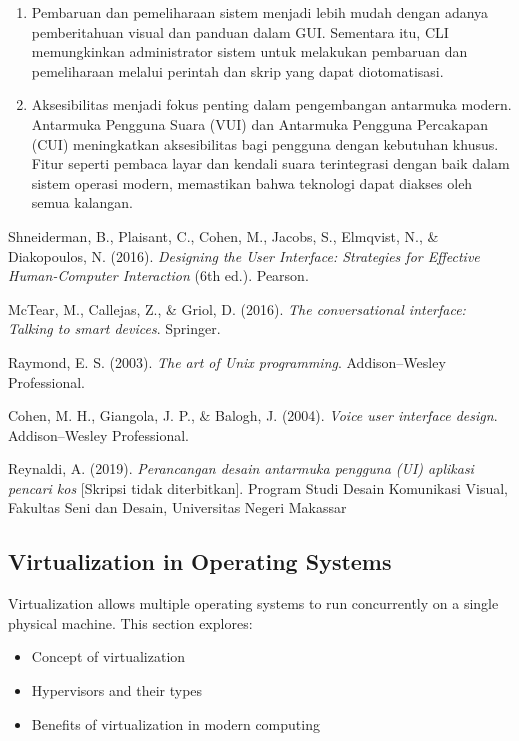 \documentclass[12pt]{article}
\begin{document}
\begin{enumerate}
\item {Pembaruan dan pemeliharaan sistem} menjadi lebih mudah dengan adanya pemberitahuan visual dan panduan dalam GUI. Sementara itu, CLI memungkinkan administrator sistem untuk melakukan pembaruan dan pemeliharaan melalui perintah dan skrip yang dapat diotomatisasi.

\item{Aksesibilitas} menjadi fokus penting dalam pengembangan antarmuka modern. Antarmuka Pengguna Suara (VUI) dan Antarmuka Pengguna Percakapan (CUI) meningkatkan aksesibilitas bagi pengguna dengan kebutuhan khusus. Fitur seperti pembaca layar dan kendali suara terintegrasi dengan baik dalam sistem operasi modern, memastikan bahwa teknologi dapat diakses oleh semua kalangan.
\end{enumerate}

\begin{thebibliography}{9} 

Shneiderman, B., Plaisant, C., Cohen, M., Jacobs, S., Elmqvist, N., \& Diakopoulos, N. (2016). \textit{Designing the User Interface: Strategies for Effective Human-Computer Interaction} (6th ed.). Pearson.

McTear, M., Callejas, Z., \& Griol, D. (2016). \textit{The conversational interface: Talking to smart devices}. Springer.

Raymond, E. S. (2003). \textit{The art of Unix programming}. Addison--Wesley Professional. 

Cohen, M. H., Giangola, J. P., \& Balogh, J. (2004). \textit{Voice user interface design}. Addison--Wesley Professional.

Reynaldi, A. (2019). \textit{Perancangan desain antarmuka pengguna (UI) aplikasi pencari kos} [Skripsi tidak diterbitkan]. Program Studi Desain Komunikasi Visual, Fakultas Seni dan Desain, Universitas Negeri Makassar


			

\end{thebibliography}




\subsection{Virtualization in Operating Systems}
Virtualization allows multiple operating systems to run concurrently on a single physical machine. This section explores:
\begin{itemize}
    \item Concept of virtualization
    \item Hypervisors and their types
    \item Benefits of virtualization in modern computing
\end{itemize}
\end{document}
